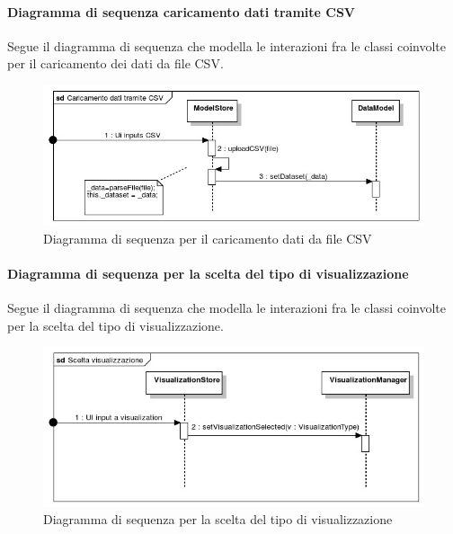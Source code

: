         \paragraph{Diagramma di sequenza caricamento dati tramite CSV}
        Segue il diagramma di sequenza che modella le interazioni fra le classi coinvolte per il caricamento dei dati da file CSV.
            \begin{figure}[H]
                \centering\includegraphics[width=1\textwidth]{source/img/sequenza1.jpeg}
                \caption{Diagramma di sequenza per il caricamento dati da file CSV}
            \end{figure}
            
        \paragraph{Diagramma di sequenza per la scelta del tipo di visualizzazione}
        Segue il diagramma di sequenza che modella le interazioni fra le classi coinvolte per la scelta del tipo di visualizzazione.
        \begin{figure}[H]
                \centering\includegraphics[width=1\textwidth]{source/img/sequenza2.jpeg}
                \caption{Diagramma di sequenza per la scelta del tipo di visualizzazione}
            \end{figure}
